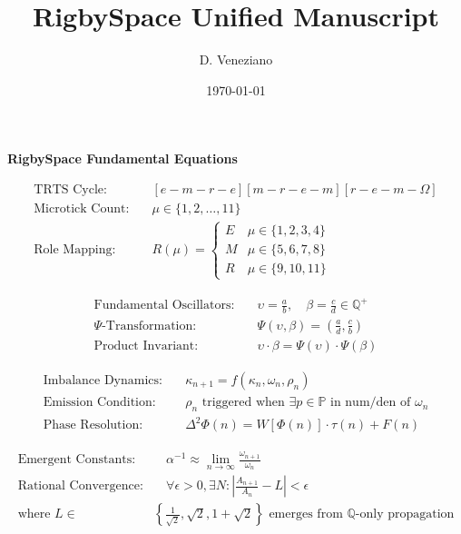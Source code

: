 \documentclass[11pt]{article}
\begin{document}
\begin{titlepage}
\vspace{7cm}
\title{RigbySpace Unified Manuscript}
\author{D. Veneziano}
\date{\today}
\vspace{1cm}
\maketitle
\end{titlepage}

\newpage
\tableofcontents
\newpage

\textbf{RigbySpace Fundamental Equations}

\begin{align*}
\text{TRTS Cycle:} & \quad [e-m-r-e][m-r-e-m][r-e-m-\Omega] \\
\text{Microtick Count:} & \quad \mu \in \{1,2,\dots,11\} \\
\text{Role Mapping:} & \quad R(\mu) = 
\begin{cases}
E & \mu \in \{1,2,3,4\} \\
M & \mu \in \{5,6,7,8\} \\
R & \mu \in \{9,10,11\}
\end{cases}
\end{align*}

\begin{align*}
\text{Fundamental Oscillators:} & \quad \upsilon = \frac{a}{b},\quad \beta = \frac{c}{d} \in \mathbb{Q}^+ \\
\Psi\text{-Transformation:} & \quad \Psi(\upsilon, \beta) = \left(\frac{a}{d}, \frac{c}{b}\right) \\
\text{Product Invariant:} & \quad \upsilon \cdot \beta = \Psi(\upsilon) \cdot \Psi(\beta)
\end{align*}

\begin{align*}
\text{Imbalance Dynamics:} & \quad \kappa_{n+1} = f(\kappa_n, \omega_n, \rho_n) \\
\text{Emission Condition:} & \quad \rho_n \text{ triggered when } \exists p \in \mathbb{P} \text{ in num/den of } \omega_n \\
\text{Phase Resolution:} & \quad \Delta^2 \Phi(n) = W[\Phi(n)] \cdot \tau(n) + F(n)
\end{align*}

\begin{align*}
\text{Emergent Constants:} & \quad \alpha^{-1} \approx \lim_{n \to \infty} \frac{\omega_{n+1}}{\omega_n} \\
\text{Rational Convergence:} & \quad \forall \epsilon > 0, \exists N : \left|\frac{A_{n+1}}{A_n} - L\right| < \epsilon \\
\text{where } L \in & \left\{\frac{1}{\sqrt{2}}, \sqrt{2}, 1+\sqrt{2}\right\} \text{ emerges from } \mathbb{Q}\text{-only propagation}
\end{align*}
\end{document}
